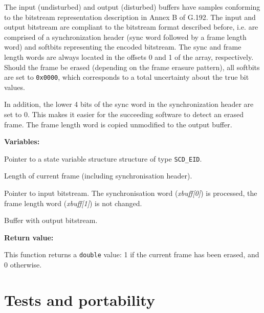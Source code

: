 The input (undisturbed) and output (disturbed) buffers have samples
conforming to the bitstream representation description in Annex B of
G.192. The input and output bitstream are compliant to the bitstream
format described before, i.e. are comprised of a synchronization
header (sync word followed by a frame length word) and softbits
representing the encoded bitstream. The sync and frame length words
are always located in the offsets 0 and 1 of the array,
respectively. Should the frame be erased (depending on the frame
erasure pattern), all softbits are set to {\tt 0x0000}, which
corresponds to a total uncertainty about the true bit values.

In addition, the lower 4 bits of the sync word in the synchronization
header are set to 0. This makes it easier for the succeeding software
to detect an erased frame. The frame length word is copied unmodified
to the output buffer.


{\bf Variables: }
\begin{Descr}{\DescrLen}
\item[\pbox{20mm}{\em EID}] %
        Pointer to a state variable structure structure of type {\tt SCD\_EID}.

\item[\pbox{20mm}{\em lseg}] %
        Length of current frame (including synchronisation header).

\item[\pbox{20mm}{\em xbuff}] %
        Pointer to input bitstream. The synchronisation word ({\em xbuff[0]})
        is processed, the frame length word ({\em xbuff[1]}) is not changed.

\item[\pbox{20mm}{\em ybuff}] %
        Buffer with output bitstream.
\end{Descr}


{\bf Return value: }

This function returns a {\tt double} value: 1 if the current frame has
been erased, and 0 otherwise.

\section {Tests and portability} \label{EID-Tests}


